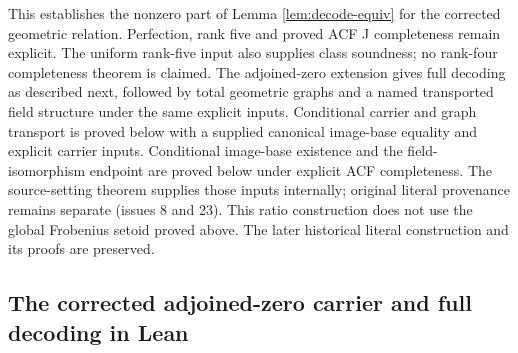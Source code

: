 \documentclass[11pt,oneside]{article}
\theoremstyle{definition}
\theoremstyle{remark}
\begin{document}
This establishes the nonzero part of Lemma \ref{lem:decode-equiv} for the
corrected geometric relation. Perfection, rank five and proved ACF
J completeness remain explicit. The uniform rank-five input also supplies
class soundness; no rank-four completeness theorem is claimed.
The adjoined-zero extension gives full decoding as described next, followed by total geometric
graphs and a named transported field structure under the same explicit inputs.
Conditional carrier and graph transport is proved below with a supplied canonical
image-base equality and explicit carrier inputs. Conditional image-base existence and the
field-isomorphism endpoint are proved below under explicit ACF completeness. The
source-setting theorem supplies those inputs internally; original literal provenance
remains separate (issues 8 and 23).
This ratio construction does not use the global Frobenius setoid proved above.
The later historical literal construction
and its proofs are preserved.

\subsection{The corrected adjoined-zero carrier and full decoding in Lean}
\end{document}
